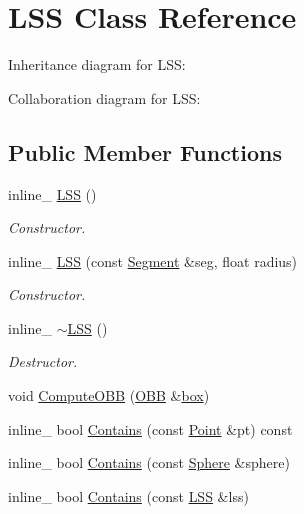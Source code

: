 \hypertarget{class_l_s_s}{\section{L\+S\+S Class Reference}
\label{class_l_s_s}
}


Inheritance diagram for L\+S\+S\+:


Collaboration diagram for L\+S\+S\+:
\subsection*{Public Member Functions}
\begin{DoxyCompactItemize}
\item 
\hypertarget{class_l_s_s_a53df3c09d262024f461a2ee1f433b06c}{inline\+\_\+ \hyperlink{class_l_s_s_a53df3c09d262024f461a2ee1f433b06c}{L\+S\+S} ()}\label{class_l_s_s_a53df3c09d262024f461a2ee1f433b06c}

\begin{DoxyCompactList}\small\item\em Constructor. \end{DoxyCompactList}\item 
\hypertarget{class_l_s_s_a171dd4bfc67cfd04f11bd22dd17fd536}{inline\+\_\+ \hyperlink{class_l_s_s_a171dd4bfc67cfd04f11bd22dd17fd536}{L\+S\+S} (const \hyperlink{class_segment}{Segment} \&seg, float radius)}\label{class_l_s_s_a171dd4bfc67cfd04f11bd22dd17fd536}

\begin{DoxyCompactList}\small\item\em Constructor. \end{DoxyCompactList}\item 
\hypertarget{class_l_s_s_a044a4572cf4e2ff4b684e235ed87ffa0}{inline\+\_\+ \hyperlink{class_l_s_s_a044a4572cf4e2ff4b684e235ed87ffa0}{$\sim$\+L\+S\+S} ()}\label{class_l_s_s_a044a4572cf4e2ff4b684e235ed87ffa0}

\begin{DoxyCompactList}\small\item\em Destructor. \end{DoxyCompactList}\item 
void \hyperlink{class_l_s_s_a23bc306ab630c6badb301409562774ea}{Compute\+O\+B\+B} (\hyperlink{class_o_b_b}{O\+B\+B} \&\hyperlink{structbox}{box})
\item 
inline\+\_\+ bool \hyperlink{class_l_s_s_a52a11bc4815694cf9c8740ee4b1ba17b}{Contains} (const \hyperlink{class_point}{Point} \&pt) const 
\item 
inline\+\_\+ bool \hyperlink{class_l_s_s_a0937e7c07a6da4cae750d02a8b164499}{Contains} (const \hyperlink{class_sphere}{Sphere} \&sphere)
\item 
inline\+\_\+ bool \hyperlink{class_l_s_s_a60a0d4b412b9c1fe88e57cfd2e81d044}{Contains} (const \hyperlink{class_l_s_s}{L\+S\+S} \&lss)
\end{DoxyCompactItemize}
